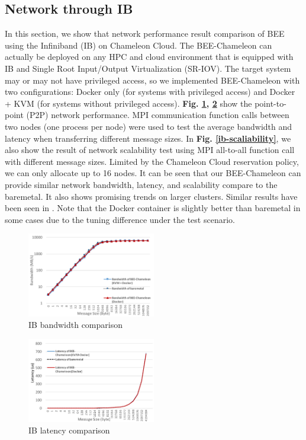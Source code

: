 \subsection{Network through IB}
In this section, we show that network performance result comparison of BEE using the Infiniband (IB) on Chameleon Cloud. The BEE-Chameleon can actually be deployed on any HPC and cloud environment that is equipped with IB and Single Root Input/Output Virtualization (SR-IOV). The target system may or may not have privileged access, so we implemented BEE-Chameleon with two configurations: Docker only (for systems with privileged access) and Docker + KVM (for systems without privileged access). \textbf{Fig. \ref{ib-bandiwdth}, \ref{ib-latency}} show the point-to-point (P2P) network performance. MPI communication function calls between two nodes (one process per node) were used to test the average bandwidth and latency when transferring different message sizes. In \textbf{Fig. \ref{ib-scaliability}}, we also show the result of network scalability test using MPI all-to-all function call with different message sizes. Limited by the Chameleon Cloud reservation policy, we can only allocate up to 16 nodes. It can be seen that our BEE-Chameleon can provide similar network bandwidth, latency, and scalability compare to the baremetal. It also shows promising trends on larger clusters. Similar results have been seen in \cite{zhang2016performance}. Note that the Docker container is slightly better than baremetal in some cases due to the tuning difference under the test scenario.  

\begin{figure}[h]
    \centering
    \includegraphics[width=0.5\textwidth]{figures/ib-bandwidth.pdf}
    \caption{IB bandwidth comparison}
    \label{ib-bandiwdth}
\end{figure}

\begin{figure}[h]
    \centering
    \includegraphics[width=0.5\textwidth]{figures/ib-latency.pdf}
    \caption{IB latency comparison}
    \label{ib-latency}
\end{figure}

